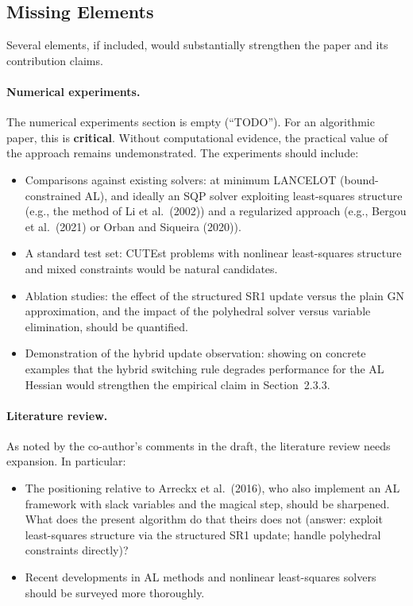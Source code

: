 \documentclass[11pt]{article}
\theoremstyle{plain}
\begin{document}
\subsection{Missing Elements}

Several elements, if included, would substantially strengthen the paper and its contribution claims.

\paragraph{Numerical experiments.} The numerical experiments section is empty (``TODO''). For an algorithmic paper, this is \textbf{critical}. Without computational evidence, the practical value of the approach remains undemonstrated. The experiments should include:
\begin{itemize}
  \item Comparisons against existing solvers: at minimum LANCELOT (bound-constrained AL), and ideally an SQP solver exploiting least-squares structure (e.g., the method of Li et al.\ (2002)) and a regularized approach (e.g., Bergou et al.\ (2021) or Orban and Siqueira (2020)).
  \item A standard test set: CUTEst problems with nonlinear least-squares structure and mixed constraints would be natural candidates.
  \item Ablation studies: the effect of the structured SR1 update versus the plain GN approximation, and the impact of the polyhedral solver versus variable elimination, should be quantified.
  \item Demonstration of the hybrid update observation: showing on concrete examples that the hybrid switching rule degrades performance for the AL Hessian would strengthen the empirical claim in Section~2.3.3.
\end{itemize}

\paragraph{Literature review.} As noted by the co-author's comments in the draft, the literature review needs expansion. In particular:
\begin{itemize}
  \item The positioning relative to Arreckx et al.\ (2016), who also implement an AL framework with slack variables and the magical step, should be sharpened. What does the present algorithm do that theirs does not (answer: exploit least-squares structure via the structured SR1 update; handle polyhedral constraints directly)?
  \item Recent developments in AL methods and nonlinear least-squares solvers should be surveyed more thoroughly.
\end{itemize}
\end{document}
